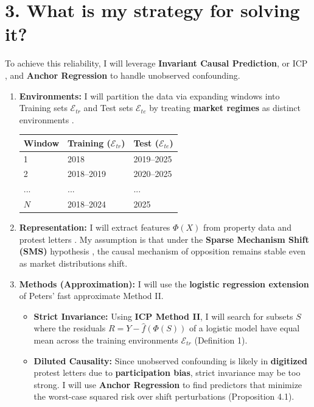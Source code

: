 \documentclass[11pt]{article}
\begin{document}
\section*{3. What is my strategy for solving it?}
To achieve this reliability, I will leverage \textbf{Invariant Causal Prediction}, or ICP \autocite[p.~953]{peters2016},
and \textbf{Anchor Regression} \autocite[p.~411]{buhlmann2020}
to handle unobserved confounding.
\begin{enumerate}
    \setlength\itemsep{-0.3em}
    \item \textbf{Environments:} I will partition the data via expanding windows into Training sets $\mathcal{E}_{tr}$ and Test sets $\mathcal{E}_{te}$ by treating \textbf{market regimes} as distinct environments \autocite{peters2016}.
    \begin{center}
    \scriptsize
    \begin{tabular}{l|l|l}
    \textbf{Window} & \textbf{Training ($\mathcal{E}_{tr}$)} & \textbf{Test ($\mathcal{E}_{te}$)} \\ \hline
    1 & 2018 & 2019--2025 \\
    2 & 2018--2019 & 2020--2025 \\
    ... & ... & ... \\
    $N$ & 2018--2024 & 2025
    \end{tabular}
    \end{center}
    \item \textbf{Representation:} I will extract features $\Phi(X)$ from property data and protest letters \autocite{scholkopf2021}. My assumption is that under the \textbf{Sparse Mechanism Shift (SMS)} hypothesis \autocite[Sec.~IV]{scholkopf2021}, the causal mechanism of opposition remains stable even as market distributions shift.
    \item \textbf{Methods (Approximation):} I will use the \textbf{logistic regression extension} of Peters' fast approximate Method II.
    \begin{itemize}
        \item \textbf{Strict Invariance:} Using \textbf{ICP Method II}, I will search for subsets $S$ where the residuals $R = Y - \hat{f}(\Phi(S))$ of a logistic model have equal mean across the training environments $\mathcal{E}_{tr}$ (Definition 1).
        \item \textbf{Diluted Causality:} Since unobserved confounding is likely in \textbf{digitized} protest letters due to \textbf{participation bias}, strict invariance may be too strong. I will use \textbf{Anchor Regression} \autocite[Eq.~4.3]{buhlmann2020}
        to find predictors that minimize the worst-case squared risk over shift perturbations (Proposition 4.1).
    \end{itemize}
\end{enumerate}
\end{document}
